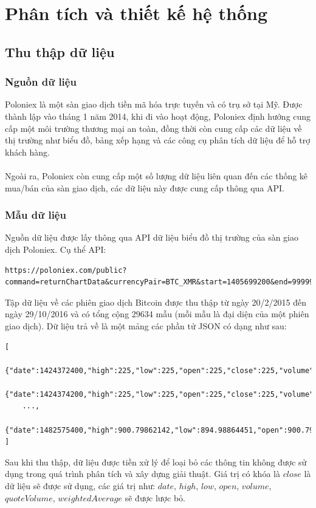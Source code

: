 \chapter{Phân tích và thiết kế hệ thống}
\section{Thu thập dữ liệu}
\subsection{Nguồn dữ liệu}
Poloniex là một sàn giao dịch tiền mã hóa trực tuyến và có trụ sở tại Mỹ. Được 
thành lập vào tháng 1 năm 2014, khi đi vào hoạt động, Poloniex định hướng cung 
cấp một môi trường thương mại an toàn, đồng thời còn cung cấp các dữ liệu về 
thị trường như biểu đồ, bảng xếp hạng và các công cụ phân tích dữ liệu để hỗ 
trợ khách hàng.\\\\
Ngoài ra, Poloniex còn cung cấp một số lượng dữ liệu liên quan đến các thống kê 
mua/bán của sàn giao dịch, các dữ liệu này được cung cấp thông qua API. 
\subsection{Mẫu dữ liệu}
Nguồn dữ liệu được lấy thông qua API dữ liệu biểu đồ thị trường của sàn giao 
dịch Poloniex. Cụ thể API:
\begin{lstlisting}
https://poloniex.com/public?command=returnChartData&currencyPair=BTC_XMR&start=1405699200&end=9999999999&period=14400
\end{lstlisting}
Tập dữ liệu về các phiên giao dịch Bitcoin được thu thập từ ngày 20/2/2015 đến 
ngày 29/10/2016 và có tổng cộng 29634 mẫu (mỗi mẫu là đại diện của một phiên 
giao dịch).
Dữ liệu trả về là một mảng các phần tử JSON có dạng như sau:
\begin{lstlisting}
[
    {"date":1424372400,"high":225,"low":225,"open":225,"close":225,"volume":0.999999,"quoteVolume":0.00444444,"weightedAverage":225},
    {"date":1424374200,"high":225,"low":225,"open":225,"close":225,"volume":0,"quoteVolume":0,"weightedAverage":225},
    ...,
    {"date":1482575400,"high":900.79862142,"low":894.98864451,"open":900.79862142,"close":895.56277339,"volume":2427.10998126,"quoteVolume":2.70065724,"weightedAverage":898.71085649}
]
\end{lstlisting}
Sau khi thu thập, dữ liệu được tiền xử lý để loại bỏ các thông tin không được 
sử dụng trong quá trình phân tích và xây dựng giải thuật. Giá trị có khóa là 
$close$ là dữ liệu sẽ được sử dụng, các giá trị như: $date$, $high$, $low$, 
$open$, $volume$, $quoteVolume$, $weightedAverage$ sẽ được lược bỏ.
